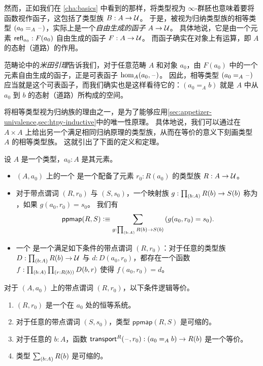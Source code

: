 然而，正如我们在 \cref{cha:basics} 中看到的那样，将类型视为 $\infty$-群胚也意味着要将函数视作函子，这包括了类型族 $B:A\to\mathcal{U}$。
于是，被视为归纳类型族的相等类型 $(a_0 =_A \mathord{\hspace{1pt}\text{--}\hspace{1pt}})$，实际上是一个\emph{自由生成的函子} $A\to\mathcal{U}$。
具体地说，它是由一个元素 $\mathsf{refl}_{a_0}: F(a_0)$ 自由生成的函子 $F:A\to\mathcal{U}$。
而函子确实在对象上有运算，即 $A$ 的态射（道路）的作用。

范畴论中的\emph{米田引理}告诉我们，对于任意范畴 $A$ 和对象 $a_0$，由 $F(a_0)$ 中的一个元素自由生成的函子，正是可表函子 $\hom_A(a_0,\mathord{\hspace{1pt}\text{--}\hspace{1pt}})$。
因此，相等类型 $(a_0 =_A \mathord{\hspace{1pt}\text{--}\hspace{1pt}})$ 应当就是这个可表函子，而我们确实也是这样看待它的：$(a_0 =_A b)$ 就是 $A$ 中从 $a_0$ 到 $b$ 的态射（道路）所构成的空间。


\mentalpause

将相等类型视为归纳族的理由之一，是为了能够应用\cref{sec:appetizer-univalence,sec:htpy-inductive}中的唯一性原理。
具体地说，我们可以通过在 $A\times A$ 上给出另一个满足相同归纳原理的类型族，从而在等价的意义下刻画类型 $A$ 的相等类型族。
这就引出了下面的定义和定理。

%
%

\begin{defn}\label{defn:identity-systems}
  设 $A$ 是一个类型，$a_0:A$ 是其元素。
  \begin{itemize}
  \item $(A,a_0)$ 上的一个 
    是一个配备了元素 $r_0:R(a_0)$ 的类型族 $R:A\to\mathcal{U}$。
  \item 对于带点谓词 $(R,r_0)$ 与 $(S,s_0)$，一个映射族 $g:\prd{b:A} R(b) \to S(b)$ 称为 ，如果 $g(a_0, r_0)=s_0$。
    我们有
    \[ \mathsf{ppmap}(R,S) \defeq \sm{g:\prd{b:A} R(b) \to S(b)} (g(a_0, r_0)=s_0).\]
  \item 一个 
    是一个满足如下条件的带点谓词 $(R,r_0)$：对于任意的类型族 $D:\prd{b:A} R(b) \to \type$ 与 $d:D(a_0,r_0)$，都存在一个函数 $f:\prd{b:A}{r:R(b)} D(b,r)$ 使得 $f(a_0,r_0)=d$。
\end{itemize}
\end{defn}

\begin{thm}\label{thm:identity-systems}
  对于 $(A,a_0)$ 上的带点谓词 $(R,r_0)$，以下条件逻辑等价。
  \begin{enumerate}
  \item $(R,r_0)$ 是一个在 $a_0$ 处的恒等系统。\label{item:identity-systems1}
  \item 对于任意的带点谓词 $(S,s_0)$，类型 $\mathsf{ppmap}(R,S)$ 是可缩的。\label{item:identity-systems2}
  \item 对于任意的 $b:A$，函数 $\mathsf{transport}^{R}(\mathord{\hspace{1pt}\text{--}\hspace{1pt}},r_0) : (a_0 =_A b) \to R(b)$ 是一个等价。\label{item:identity-systems3}
  \item 类型 $\sm{b:A} R(b)$ 是可缩的。\label{item:identity-systems4}
  \end{enumerate}
\end{thm}

